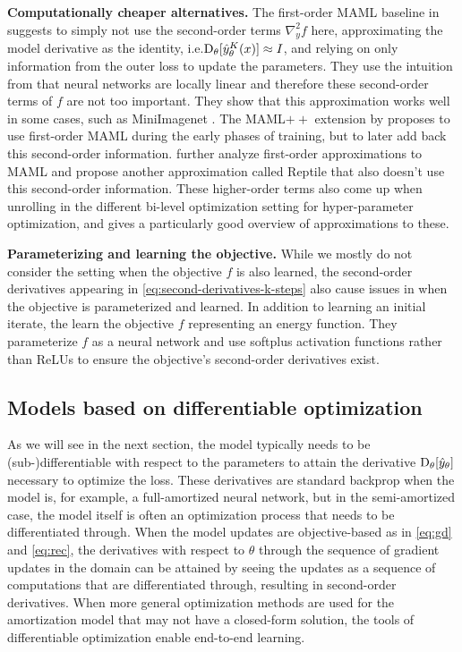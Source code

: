 \documentclass[twoside,11pt]{article}
\newcommand{\ie}{i.e.\xspace}
\begin{document}
\textbf{Computationally cheaper alternatives.}
The first-order MAML baseline in \citet{finn2017model} suggests to
simply not use the second-order terms $\nabla_y^2 f$ here,
approximating the model derivative as the identity,
\ie $\mathrm{D}_\theta[\hat y_\theta^K(x)]\approx I$,
and relying on only information from the outer loss
to update the parameters.
They use the intuition from \citet{goodfellow2014explaining}
that neural networks are locally linear and therefore these
second-order terms of $f$ are not too important.
They show that this approximation works well in some cases,
such as MiniImagenet \citep{ravi2016optimization}.
The MAML$++$ extension by \citet{antoniou2018train} proposes to
use first-order MAML during the early phases of training, but
to later add back this second-order information.
\citet{nichol2018first} further analyze first-order approximations
to MAML and propose another approximation called Reptile that
also doesn't use this second-order information.
These higher-order terms also come up when unrolling in the
different bi-level optimization setting for hyper-parameter optimization,
and \citet[Table 1]{lorraine2020optimizing} gives
a particularly good overview of approximations to these.

\textbf{Parameterizing and learning the objective.}
While we mostly do not consider the setting when
the objective $f$ is also learned,
the second-order derivatives appearing in
\cref{eq:second-derivatives-k-steps}
also cause issues in when the objective is parameterized
and learned.
In addition to learning an initial iterate, \citet{belanger2017end}
the learn the objective $f$ representing an energy function.
They parameterize $f$ as a neural network and use softplus
activation functions rather than ReLUs to ensure the
objective's second-order derivatives exist.

\subsection{Models based on differentiable optimization}
As we will see in the next section, the model typically needs
to be (sub-)differentiable with respect to the parameters
to attain the derivative $\mathrm{D}_\theta[\hat y_\theta]$ necessary
to optimize the loss.
These derivatives are standard backprop when the model
is, for example, a full-amortized neural network, but
in the semi-amortized case, the model itself is often an
optimization process that needs to be differentiated through.
When the model updates are objective-based as in
\cref{eq:gd} and \cref{eq:rec}, the derivatives with respect
to $\theta$ through the sequence of gradient updates
in the domain can be attained by seeing the updates
as a sequence of computations that are differentiated through,
resulting in second-order derivatives.
When more general optimization methods are used for
the amortization model that may not have a closed-form
solution, the tools of differentiable optimization
\citep{domke2012generic,gould2016differentiating,amos2017optnet,amos2019differentiable,agrawal2019differentiable}
enable end-to-end learning.
\end{document}
